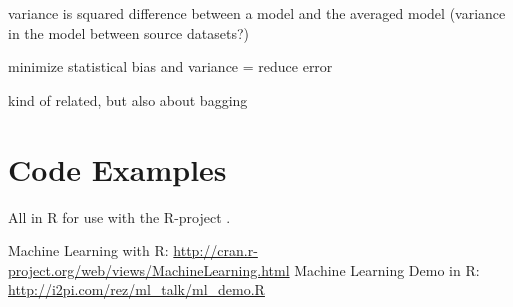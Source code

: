 \begin{bibunit}
variance is squared difference between a model and the averaged model (variance in the model between source datasets?)

minimize statistical bias and variance = reduce error


kind of related, but also about bagging \cite{Tibshirani1996a}


\section{Code Examples}

All in R for use with the R-project \cite{RDevelopmentCoreTeam2011}.

Machine Learning with R: \url{http://cran.r-project.org/web/views/MachineLearning.html}
Machine Learning Demo in R: \url{http://i2pi.com/rez/ml_talk/ml_demo.R}



\renewcommand{\bibsection}{\section{\bibname}}
\putbib
\end{bibunit}
